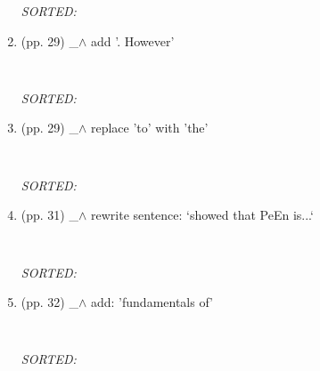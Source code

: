 \documentclass[12pt]{article}
\begin{document}
\begin{enumerate}
\begin{verbatim}
	\end{verbatim}
	\textit{
	SORTED:  
	}
	\\

\item  (pp. 29)  \_$\wedge$  
	add '. However'
	\begin{verbatim}
	
	\end{verbatim}
	\textit{
	SORTED:  
	}
	\\



\item  (pp. 29)  \_$\wedge$  
	replace 'to' with 'the'
	\begin{verbatim}
	
	\end{verbatim}
	\textit{
	SORTED:  
	}
	\\

\item  (pp. 31)  \_$\wedge$  
	rewrite sentence:
	`showed that PeEn is...`
	\begin{verbatim}
	
	\end{verbatim}
	\textit{
	SORTED:  
	}
	\\

\item  (pp. 32)  \_$\wedge$  
	add: 'fundamentals of'
	\begin{verbatim}
	
	\end{verbatim}
	\textit{
	SORTED:  
	}
	\\



\end{enumerate}
\end{document}
